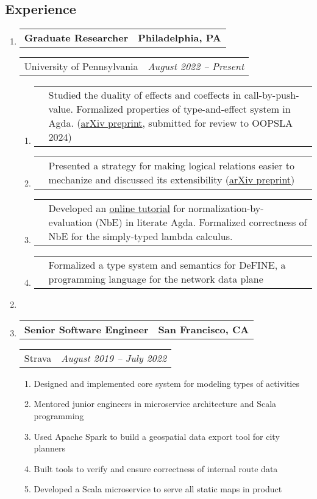 \documentclass[letterpaper]{article}
\makeatletter
\newcommand*{\tabulardef}[3]{\begin{tabular}[t]{@{}lp{\dimexpr\linewidth-#1}@{}}
    #2&#3
\end{tabular}}
\newcommand{\headerrow}[2]
{\begin{tabular*}{\linewidth}{l@{\extracolsep{\fill}}r}
	#1 &
	#2 \\
\end{tabular*}}
\makeatother
\begin{document}
\subsection*{Experience}

\begin{enumerate}[label=]
	\parskip=-0.25em

	\item
		\headerrow
			{\textbf{Graduate Researcher}}
			{\textbf{Philadelphia, PA}}
	\headerrow
		{University of Pennsylvania}
        {\emph{August 2022 -- Present}}
	\begin{enumerate}[label= *]
	\parskip=-0.1em
        \item\tabulardef{4cm}{}{Studied the duality of effects and coeffects in call-by-push-value.
            Formalized properties of type-and-effect system in Agda. (\href{https://arxiv.org/abs/2311.11795}{arXiv preprint}, submitted for review to OOPSLA 2024)}
        \item\tabulardef{4cm}{}{Presented a strategy for making logical relations easier to mechanize and discussed its extensibility
            (\href{https://arxiv.org/abs/2309.15724}{arXiv preprint})}
        \item\tabulardef{4cm}{}{Developed an \href{https://emmanuelsuarez.com/posts/2023-11-21-nbe.html}{online tutorial} for normalization-by-evaluation (NbE) in
            literate Agda. Formalized correctness of NbE for the simply-typed lambda calculus.}
        \item\tabulardef{4cm}{}{Formalized a type system and semantics for DeFINE, a programming
            language for the network data plane}
	\end{enumerate}

    \item

	\item
		\headerrow
			{\textbf{Senior Software Engineer}}
			{\textbf{San Francisco, CA}}
	\headerrow
		{Strava}
		{\emph{August 2019 -- July 2022}}
	\begin{enumerate}[label= *]
	\parskip=-0.1em
        \item Designed and implemented core system for modeling types of activities
        \item Mentored junior engineers in microservice architecture and Scala programming
		\item Used Apache Spark to build a geospatial data export tool for city planners
		\item Built tools to verify and ensure correctness of internal route data
		\item Developed a Scala microservice to serve all static maps in product
	\end{enumerate}
	

\end{enumerate}
\end{document}
